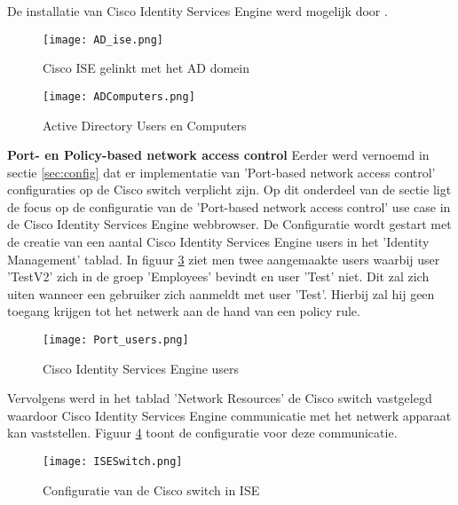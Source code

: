 De installatie van Cisco Identity Services Engine werd mogelijk door \cite{CiscoISE_InstallationGuide}.

\begin{figure}[H]
	\centering
	\texttt{[image: AD\_ise.png]}
	\caption{Cisco ISE gelinkt met het AD domein}%
	\label{fig:AD_Cisco1}%
\end{figure}

\begin{figure}[H]
	\centering
	\texttt{[image: ADComputers.png]}
	\caption{Active Directory Users en Computers}
	\label{fig:AD_Cisco2}
\end{figure}

\fontsize{12}{20}\textbf{Port- en Policy-based network access control }
 \newline
\newline
	Eerder werd vernoemd in sectie \ref{sec:config} dat er implementatie van 'Port-based network access control' configuraties op de Cisco switch verplicht zijn. Op dit onderdeel van de sectie ligt de focus op de configuratie van de 'Port-based network access control' use case in de Cisco Identity Services Engine webbrowser. 
	\newline
	\newline
	De Configuratie wordt gestart met de creatie van een aantal Cisco Identity Services Engine users in het 'Identity Management' tablad. In figuur \ref{fig:users} ziet men twee aangemaakte users waarbij user 'TestV2' zich in de groep 'Employees' bevindt en user 'Test' niet. Dit zal zich uiten wanneer een gebruiker zich aanmeldt met user 'Test'. Hierbij zal hij geen toegang krijgen tot het netwerk aan de hand van een policy rule.
 	\begin{figure}[H]
 		\centering
 		\texttt{[image: Port\_users.png]}
 		\caption{Cisco Identity Services Engine users}%
 		\label{fig:users}%
 	\end{figure}
 Vervolgens werd in het tablad 'Network Resources' de Cisco switch vastgelegd waardoor Cisco Identity Services Engine communicatie met het netwerk apparaat kan vaststellen. Figuur \ref{fig:ISESwitch} toont de configuratie voor deze communicatie. 
 	
 	 	\begin{figure}[H]
 		\centering
 		\texttt{[image: ISESwitch.png]}
 		\caption{Configuratie van de Cisco switch in ISE}%
 		\label{fig:ISESwitch}%
 		\end{figure}
 	
